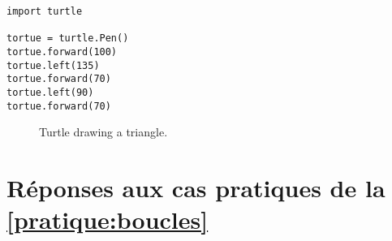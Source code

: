 \begin{enumerate}
\begin{Verbatim}[frame=single,rulecolor=\color{mbleu}, label=à taper]
import turtle

tortue = turtle.Pen()
tortue.forward(100)
tortue.left(135)
tortue.forward(70)
tortue.left(90)
tortue.forward(70)
\end{Verbatim}

\begin{figure}
\begin{center}
\end{center}
\caption{Turtle drawing a triangle.}\label{fig47}
\end{figure}

\end{enumerate}

\section{Réponses aux cas pratiques de la \autoref{pratique:boucles}\label{reponses:boucles}}
